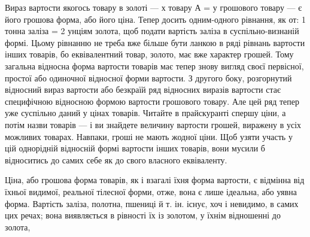 Вираз вартости якогось товару в золоті — х товару А = у
грошового товару — є його грошова форма, або його ціна. Тепер
досить одним-одного рівнання, як от: 1 тонна заліза = 2 унціям
золота, щоб подати вартість заліза в суспільно-визнаній формі.
Цьому рівнанню не треба вже більше бути ланкою в ряді рівнань
вартости інших товарів, бо еквівалентний товар, золото, має
вже характер грошей. Тому загальна відносна форма вартости
товарів має тепер знову вигляд своєї первісної, простої або одиночної
відносної форми вартости. З другого боку, розгорнутий
відносний вираз вартости або безкраїй ряд відносних виразів
вартости стає специфічною відносною формою вартости грошового
товару. Але цей ряд тепер уже суспільно даний у цінах
товарів. Читайте в прайскуранті спершу ціни, а потім назви
товарів — і ви знайдете величину вартости грошей, виражену
в усіх можливих товарах. Навпаки, гроші не мають жодної
ціни. Щоб узяти участь у цій однорідній відносній формі вартости
інших товарів, вони мусили б відноситись до самих себе як до
свого власного еквіваленту.

Ціна, або грошова форма товарів, як і взагалі їхня форма вартости,
є відмінна від їхньої видимої, реальної тілесної форми, отже,
вона є лише ідеальна, або уявна форма. Вартість заліза, полотна,
пшениці й т. ін. існує, хоч і невидимо, в самих цих речах; вона
виявляється в рівності їх із золотом, у їхнім відношенні до золота,
\parbreak{}  %
